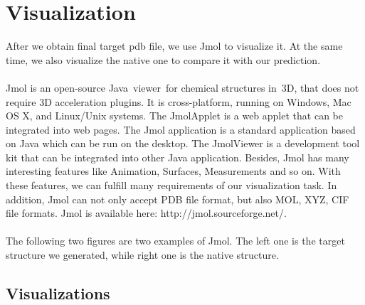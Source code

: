 \documentclass{article}
\begin{document}
\section{Visualization}

   After we obtain final target pdb file, we use Jmol to visualize it. At the same time, we also visualize the native one to compare it with our prediction.\\\\
Jmol is an open-source Java viewer for chemical structures in 3D, that does not require 3D acceleration plugins. It is cross-platform, running on Windows, Mac OS X, and Linux/Unix systems. The JmolApplet is a web applet that can be integrated into web pages. The Jmol application is a standard application based on Java which can be run on the desktop. The JmolViewer is a development tool kit that can be integrated into other Java application. Besides, Jmol has many interesting features like Animation, Surfaces, Measurements and so on. With these features, we can fulfill many requirements of our visualization task. In addition, Jmol can not only accept PDB file format, but also MOL, XYZ, CIF file formats. Jmol is available here: http://jmol.sourceforge.net/.\\\\
The following two figures are two examples of Jmol. The left one is the target structure we generated, while right one is the native structure.

\subsection{Visualizations}
\end{document}
